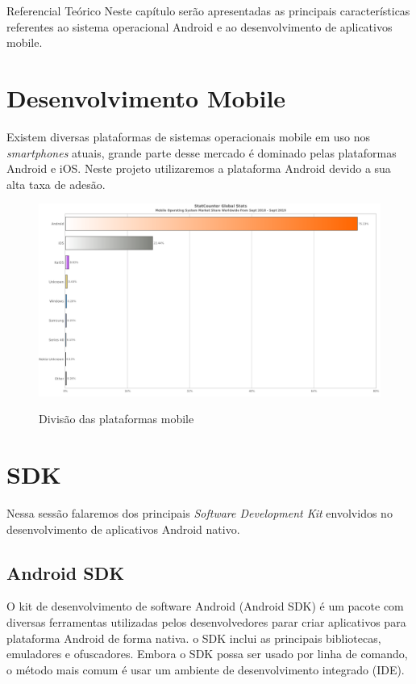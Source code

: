 \documentclass[
	12pt,				%
	openright,			%
	twoside,			%
	a4paper,			%
	english,			%
	french,				%
	spanish,			%
	brazil				%
	]{abntex2}
\begin{document}
\begin{chapter}{Referencial Teórico}
Neste capítulo serão apresentadas as principais características referentes ao sistema operacional Android e ao desenvolvimento de aplicativos mobile.

\section{Desenvolvimento Mobile}
Existem diversas plataformas de sistemas operacionais mobile em uso nos \textit{smartphones} atuais, grande parte desse mercado é dominado pelas plataformas Android e iOS. Neste projeto utilizaremos a plataforma Android devido a sua alta taxa de adesão.

\begin{figure}[h]
\centering
   \caption{Divisão das plataformas mobile}
   \includegraphics[scale=0.4]{media/grafico_plataformas.png}
     \label{fig:plataformas_mobile}
\end{figure}

\newpage
\section{SDK}
Nessa sessão falaremos dos principais \textit{Software Development Kit} envolvidos no desenvolvimento de aplicativos Android nativo.
\subsection{Android SDK}
O kit de desenvolvimento de software Android (Android SDK) é um pacote com diversas ferramentas utilizadas pelos desenvolvedores parar criar aplicativos para plataforma Android de forma nativa. o SDK inclui as principais bibliotecas, emuladores e ofuscadores.
Embora o SDK possa ser usado por linha de comando, o método mais comum é usar um ambiente de desenvolvimento integrado (IDE). 

\end{chapter}
\end{document}
